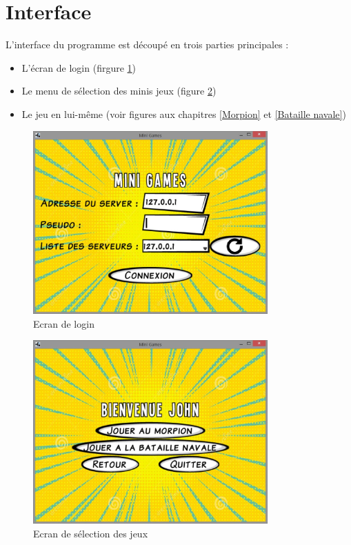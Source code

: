 \documentclass{report}
\begin{document}
\section{Interface}
L'interface du programme est découpé en trois parties principales :

\begin{itemize}
  \item L'écran de login (firgure \ref{Ecran de login})
  \item Le menu de sélection des minis jeux (figure \ref{Ecran de selection})
  \item Le jeu en lui-même (voir figures aux chapitres \ref{Morpion} et \ref{Bataille navale})
\end{itemize}

\begin{figure}[H]
	\centering\includegraphics[width=9cm]{loginScreen}
	\caption{Ecran de login}
	\label{Ecran de login}
\end{figure}

\begin{figure}[H]
	\centering\includegraphics[width=9cm]{menuJeux}
	\caption{Ecran de sélection des jeux}
	\label{Ecran de selection}
\end{figure}
\end{document}

